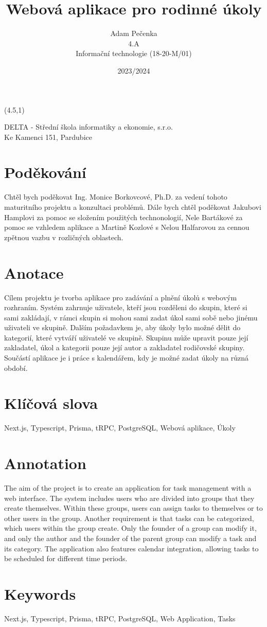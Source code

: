 \documentclass[a4paper,12pt]{report}
\title{Webová aplikace pro rodinné úkoly}
\author{Adam Pečenka\\ 4.A\\ Informační technologie (18-20-M/01)\\}
\date{2023/2024}
\newcommand{\unnumberedsection}[1]{%
  \section*{#1}%
}
\begin{document}
\onehalfspacing 
\linespread{1.125}
\begin{textblock}{7}(4.5,1)
\begin{center}
\noindent \normalsize DELTA - Střední škola informatiky a ekonomie, s.r.o.\\Ke Kamenci 151, Pardubice
\end{center}
\end{textblock}
\maketitle

\pagebreak
\unnumberedsection{Poděkování}
Chtěl bych poděkovat Ing. Monice Borkovcové, Ph.D. za vedení tohoto maturitního projektu a
konzultaci problémů. Dále bych chtěl poděkovat Jakubovi Hamplovi za pomoc se složením použitých technonologií, Nele Bartákové za pomoc se vzhledem aplikace a Martině Kozlové s Nelou Halfarovou za cennou zpětnou vazbu v rozličných oblastech.
\pagebreak

\pagebreak
\unnumberedsection{Anotace}
Cílem projektu je tvorba aplikace pro zadávání a plnění úkolů s webovým rozhraním.
Systém zahrnuje uživatele, kteří jsou rozděleni do skupin, které si sami zakládají, v rámci skupin si mohou sami zadat úkol sami sobě nebo jinému uživateli ve skupině. Dalším požadavkem je, aby úkoly bylo možné dělit do kategorií, které vytváří uživatelé ve skupině. Skupinu může upravit pouze její zakladatel, úkol a kategorii pouze její autor a zakladatel rodičovské skupiny. Součástí aplikace je i práce s kalendářem, kdy je možné zadat úkoly na různá období.
\unnumberedsection{Klíčová slova}
Next.js, Typescript, Prisma, tRPC, PostgreSQL, Webová aplikace, Úkoly
\unnumberedsection{Annotation}
The aim of the project is to create an application for task management with a web interface. The system includes users who are divided into groups that they create themselves. Within these groups, users can assign tasks to themselves or to other users in the group. Another requirement is that tasks can be categorized, which users within the group create. Only the founder of a group can modify it, and only the author and the founder of the parent group can modify a task and its category. The application also features calendar integration, allowing tasks to be scheduled for different time periods.

\unnumberedsection{Keywords}
Next.js, Typescript, Prisma, tRPC, PostgreSQL, Web Application, Tasks
\pagebreak
\end{document}
